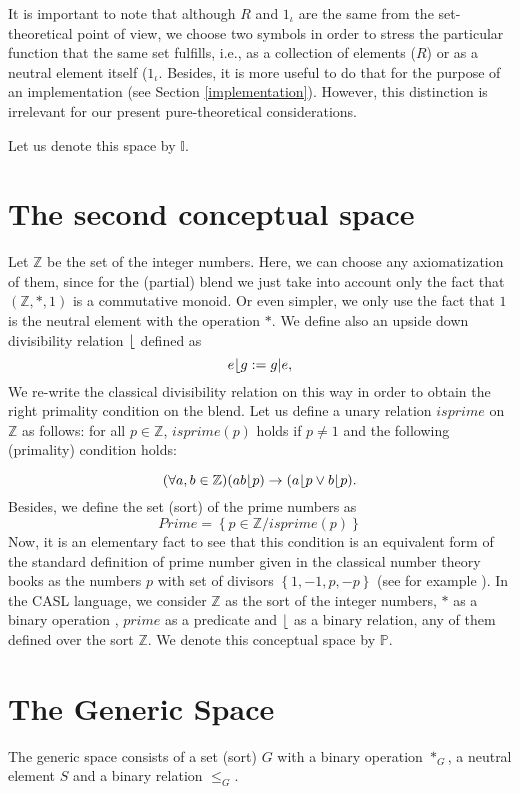 It is important to note that although $R$ and $1_{\iota}$ are the same
from the set-theoretical point of view, we choose two symbols in order
to stress the particular function that the same set fulfills, i.e., as
a collection of elements ($R$) or as a neutral element itself
($1_{\iota}$. Besides, it is more useful to do that for the purpose of
an implementation (see Section \ref{implementation}). However, this
distinction is irrelevant for our present pure-theoretical
considerations.
 
Let us denote this space by $\mathbb{I}$.

\section{The second conceptual space}
Let $\mathbb{Z}$ be the set of the integer numbers. Here, we can
choose any axiomatization of them, since for the (partial) blend we
just take into account only the fact that $(\mathbb{Z},*,1)$ is a
commutative monoid. Or even simpler, we only use the fact that $1$ is
the neutral element with the operation $*$.  We define also an upside
down divisibility relation $\lfloor$ defined as
%
\[e\lfloor g:=g|e,\] We re-write the classical divisibility relation
on this way in order to obtain the right primality condition on the
blend.  Let us define a unary relation $isprime$ on $\mathbb{Z}$ as
follows: for all $p\in \mathbb{Z}$, $isprime(p)$ holds if $p\neq 1$
and the following (primality) condition holds:

\[(\forall a,b\in \mathbb{Z})(ab \lfloor p)\rightarrow (a \lfloor p \vee b \lfloor p).\] 
Besides, we define the set (sort) of the prime numbers as 
\[ Prime=\left\{ p\in \mathbb{Z}/ isprime(p)\right\}\] Now, it is an
elementary fact to see that this condition is an equivalent form of
the standard definition of prime number given in the classical number
theory books as the numbers $p$ with set of divisors
$\left\{1,-1,p,-p\right\}$ (see for example
\cite{Apostol76}). In the CASL language, we consider
$\mathbb{Z}$ as the sort of the integer numbers, $*$ as a binary
operation , $prime$ as a predicate and $\lfloor$ as a binary
relation, any of them defined over the sort $\mathbb{Z}$.
We denote this conceptual space by $\mathbb{P}$.


\section{The Generic Space}

The generic space consists of a set (sort) $G$ with a binary operation $*_G$, a neutral element $S$ and a binary relation $\leq_G$.

